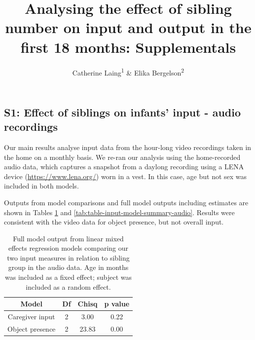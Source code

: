 \documentclass[
  english,
  man,floatsintext]{apa6}
\title{Analysing the effect of sibling number on input and output in the first 18 months: Supplementals}
\author{Catherine Laing\textsuperscript{1} \& Elika Bergelson\textsuperscript{2}}
\date{}
\affiliation{\vspace{0.5cm}\textsuperscript{1} University of York, York, UK\\\textsuperscript{2} Duke University, Durham, NC, USA}
\begin{document}
\maketitle

\hypertarget{s1-effect-of-siblings-on-infants-input---audio-recordings}{%
\subsection{S1: Effect of siblings on infants' input - audio recordings}\label{s1-effect-of-siblings-on-infants-input---audio-recordings}}

Our main results analyse input data from the hour-long video recordings taken in the home on a monthly basis. We re-ran our analysis using the home-recorded audio data, which captures a snapshot from a daylong recording using a LENA device (\url{https://www.lena.org/}) worn in a vest. In this case, age but not sex was included in both models.

Outputs from model comparisons and full model outputs including estimates are shown in Tables \ref{tab:table-model-comparisons-audio} and \ref{tab:table-input-model-summary-audio}. Results were consistent with the video data for object presence, but not overall input.

\begin{longtable}[t]{cccc}
\caption{\label{tab:table-model-comparisons-audio}Full model output from linear mixed effects regression models comparing our two input measures in relation to sibling group in the audio data. Age in months was included as a fixed effect; subject was included as a random effect.}\\
\toprule
Model & Df & Chisq & p value\\
\midrule
Caregiver input & 2 & 3.00 & 0.22\\
Object presence & 2 & 23.83 & 0.00\\
\bottomrule
\end{longtable}
\end{document}
